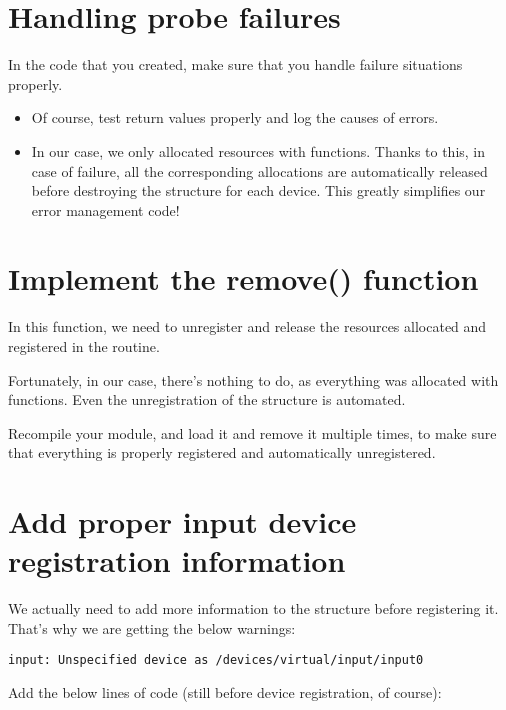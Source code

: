 \section{Handling probe failures}

In the code that you created, make sure that you handle failure
situations properly.

\begin{itemize}
\item Of course, test return values properly and log
      the causes of errors.
\item In our case, we only allocated resources with 
      functions. Thanks to this, in case of failure, all the
      corresponding allocations are automatically released
      before destroying the  structure for each
      device. This greatly simplifies our error management code!
\end{itemize}

\section{Implement the remove() function}

In this function, we need to unregister and release the resources allocated
and registered in the  routine.

Fortunately, in our case, there's nothing to do, as everything
was allocated with  functions. Even the unregistration
of the  structure is automated. 

Recompile your module, and load it and remove it multiple times, to
make sure that everything is properly registered and automatically
unregistered.

\section{Add proper input device registration information}

We actually need to add more information to the  structure before
registering it. That's why we are getting the below warnings:

\begin{verbatim}
input: Unspecified device as /devices/virtual/input/input0
\end{verbatim}

Add the below lines of code (still before device registration, of
course):


